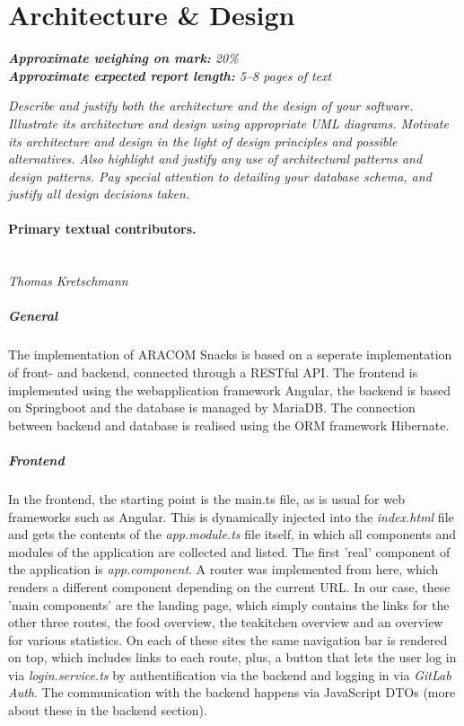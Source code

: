 \section{Architecture \& Design}
\label{sec:architecture_design}

\emph{\textbf{Approximate weighing on mark:} 20\%}							\\
\emph{\textbf{Approximate expected report length:} 5--8 pages of text}

\emph{Describe and justify both the architecture and the design of your software. Illustrate its architecture and design using appropriate UML diagrams. Motivate its architecture and design in the light of design principles and possible alternatives. Also highlight and justify any use of architectural patterns and design patterns. Pay special attention to detailing your database schema, and justify all design decisions taken.}

\paragraph{Primary textual contributors.}
\mbox{}\\\emph{Thomas Kretschmann}

\subparagraph{General}
The implementation of ARACOM Snacks is based on a seperate implementation of front- and backend, connected through a RESTful API. 
The frontend is implemented using  the webapplication framework Angular, the backend is based on Springboot and the database is managed by MariaDB. The connection between backend and database is realised using the ORM framework Hibernate.

\subparagraph{Frontend}
In the frontend, the starting point is the main.ts file, as is usual for web frameworks such as Angular. This is dynamically injected into the \textit{index.html} file and gets the contents of the \textit{app.module.ts} file itself, in which all components and modules of the application are collected and listed. The first 'real' component of the application is \textit{app.component}. A router was implemented from here, which renders a different component depending on the current URL. In our case, these 'main components' are the landing page, which simply contains the links for the other three routes, the food overview, the teakitchen overview and an overview for various statistics. On each of these sites the same navigation bar is rendered on top, which includes links to each route, plus, a button that lets the user log in via \textit{login.service.ts} by authentification via the backend and logging in via \textit{GitLab Auth}. The communication with the backend happens via JavaScript DTOs (more about these in the backend section).

